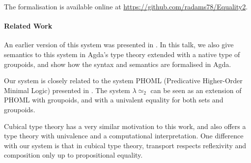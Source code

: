 \documentclass{easychair}
\newcommand{\LEtwo}{\ensuremath{\lambda \! \! \simeq_2}}
\begin{document}

The formalisation is available online at \url{https://github.com/radams78/Equality2}.

\paragraph{Related Work}

An earlier version of this system was presented in \cite{ap:tsnhu}.  In this talk, we also give semantics to this system in Agda's type theory extended with a native type of groupoids, and show how the syntax and semantics are formalised in Agda.

Our system is closely related to the system PHOML (Predicative Higher-Order Minimal Logic) presented in \cite{abc:ncrpehoml}.  The system $\LEtwo$ can be seen as an extension of PHOML with groupoids, and with a univalent equality for both sets and groupoids.

Cubical type theory \cite{cchm:cubical, huber:canonicity} has a very similar motivation to this work, and also offers a type theory with univalence and a computational interpretation.  One difference with our system is that in cubical type theory, transport respects reflexivity and composition only up to propositional equality.



\end{document}
